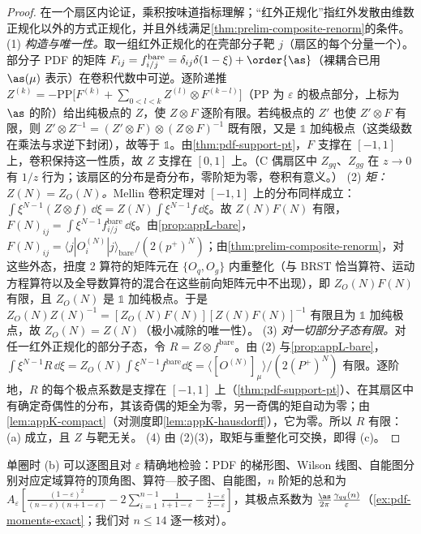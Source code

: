 \begin{proof}
在一个扇区内论证，乘积按味道指标理解；“红外正规化”指红外发散由维数正规化以外的方式正规化，并且外线满足\cref{thm:prelim-composite-renorm}的条件。
(1) \emph{构造与唯一性。}取一组红外正规化的在壳部分子靶 $j$（扇区的每个分量一个）。部分子 PDF 的矩阵 $F_{ij}=f^{\mathrm{bare}}_{i/j}=\delta_{ij}\delta(1-\xi)+\order{\as}$（裸耦合已用 $\as(\mu)$ 表示）在卷积代数中可逆。逐阶递推
$Z^{(k)}=-\mathrm{PP}\big[F^{(k)}+\sum_{0<l<k}Z^{(l)}\otimes F^{(k-l)}\big]$（$\mathrm{PP}$ 为 $\varepsilon$ 的极点部分，上标为 $\as$ 的阶）给出纯极点的 $Z$，使 $Z\otimes F$ 逐阶有限。若纯极点的 $Z'$ 也使 $Z'\otimes F$ 有限，则 $Z'\otimes Z^{-1}=(Z'\otimes F)\otimes(Z\otimes F)^{-1}$ 既有限，又是 $\mathbb 1$ 加纯极点（这类级数在乘法与求逆下封闭），故等于 $\mathbb 1$。由\cref{thm:pdf-support-pt}，$F$ 支撑在 $[-1,1]$ 上，卷积保持这一性质，故 $Z$ 支撑在 $[0,1]$ 上。（C 偶扇区中 $Z_{gq}$、$Z_{gg}$ 在 $z\to0$ 有 $1/z$ 行为；该扇区的分布是奇分布，零阶矩为零，卷积有意义。）
(2) \emph{矩：$Z(N)=Z_O(N)$。}Mellin 卷积定理对 $[-1,1]$ 上的分布同样成立：$\int\xi^{N-1}(Z\otimes f)\,\dd\xi=Z(N)\int\xi^{N-1}f\,\dd\xi$。故 $Z(N)F(N)$ 有限，$F(N)_{ij}=\int\xi^{N-1}f^{\mathrm{bare}}_{i/j}\,\dd\xi$。由\cref{prop:appL-bare}，$F(N)_{ij}=\langle j|O^{(N)}_i|j\rangle_{\mathrm{bare}}/(2(p^+)^N)$；由\cref{thm:prelim-composite-renorm}，对这些外态，扭度 2 算符的矩阵元在 $\{O_q,O_g\}$ 内重整化（与 BRST 恰当算符、运动方程算符以及全导数算符的混合在这些前向矩阵元中不出现），即 $Z_O(N)F(N)$ 有限，且 $Z_O(N)$ 是 $\mathbb 1$ 加纯极点。于是 $Z_O(N)Z(N)^{-1}=[Z_O(N)F(N)][Z(N)F(N)]^{-1}$ 有限且为 $\mathbb 1$ 加纯极点，故 $Z_O(N)=Z(N)$（极小减除的唯一性）。
(3) \emph{对一切部分子态有限。}对任一红外正规化的部分子态，令 $R=Z\otimes f^{\mathrm{bare}}$。由 (2) 与\cref{prop:appL-bare}，$\int\xi^{N-1}R\,\dd\xi=Z_O(N)\int\xi^{N-1}f^{\mathrm{bare}}\dd\xi=\langle[O^{(N)}]_\mu\rangle/(2(P^+)^N)$ 有限。逐阶地，$R$ 的每个极点系数是支撑在 $[-1,1]$ 上（\cref{thm:pdf-support-pt}）、在其扇区中有确定奇偶性的分布，其该奇偶的矩全为零，另一奇偶的矩自动为零；由\cref{lem:appK-compact}（对测度即\cref{lem:appK-hausdorff}），它为零。所以 $R$ 有限：(a) 成立，且 $Z$ 与靶无关。
(4) 由 (2)(3)，取矩与重整化可交换，即得 (c)。
\end{proof}

单圈时 (b) 可以逐图且对 $\varepsilon$ 精确地检验：PDF 的梯形图、Wilson 线图、自能图分别对应定域算符的顶角图、算符—胶子图、自能图，$n$ 阶矩的总和为 $A_\varepsilon[\frac{(1-\varepsilon)^2}{(n-\varepsilon)(n+1-\varepsilon)}-2\sum_{i=1}^{n-1}\frac1{i+1-\varepsilon}-\frac{1-\varepsilon}{2-\varepsilon}]$，其极点系数为 $\frac{\as}{2\pi}\frac{\gamma_{qq}(n)}{\varepsilon}$（\cref{ex:pdf-moments-exact}；我们对 $n\le14$ 逐一核对）。

